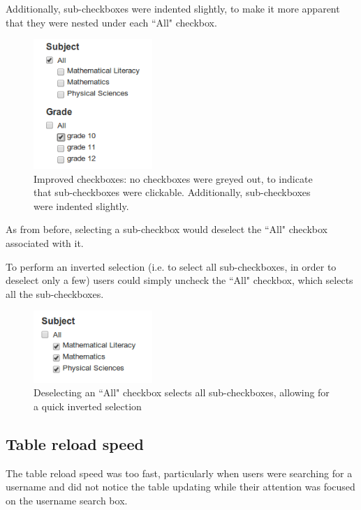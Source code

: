 Additionally, sub-checkboxes were indented slightly, to make it more apparent that they were nested under each ``All" checkbox.

\begin{figure}[h!]
    \centering
    \includegraphics[width=0.4\textwidth]{Figures/V2/checkboxes.png}
 \caption{Improved checkboxes: no checkboxes were greyed out, to indicate that sub-checkboxes were clickable. Additionally, sub-checkboxes were indented slightly.	}
\end{figure}


As from before, selecting a sub-checkbox would deselect the ``All" checkbox associated with it. 

To perform an inverted selection (i.e. to select all sub-checkboxes, in order to deselect only a few) users could simply uncheck the ``All" checkbox, which selects all the sub-checkboxes.

\begin{figure}[h!]
    \centering
    \includegraphics[width=0.4\textwidth]{Figures/V2/deselectAll.png}
 \caption{Deselecting an ``All" checkbox selects all sub-checkboxes, allowing for a quick inverted selection}
\end{figure}


\subsection{Table reload speed}
The table reload speed was too fast, particularly when users were searching for a username and did not notice the table updating while their attention was focused on the username search box. 

